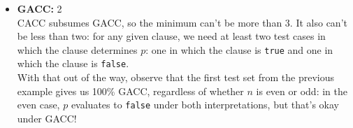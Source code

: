 \documentclass[addpoints, answers]{exam}
\newcommand{\Code}[1]{\texttt{#1}}
\begin{document}
\begin{questions}
\begin{solution}
\begin{itemize}
      \item \textbf{GACC:} 2 \\
        CACC subsumes GACC, so the minimum can't be more than 3. It
        also can't be less than two: for any given clause, we need at
        least two test cases in which the clause determines $p$: one
        in which the clause is \Code{true} and one in which the clause
        is \Code{false}. \\
        With that out of the way, observe that the first test set from
        the previous example gives us 100\% GACC, regardless of
        whether $n$ is even or odd: in the even case, $p$ evaluates to
        \Code{false} under both interpretations, but that's okay under GACC!



\end{itemize}
\end{solution}
\end{questions}
\end{document}
